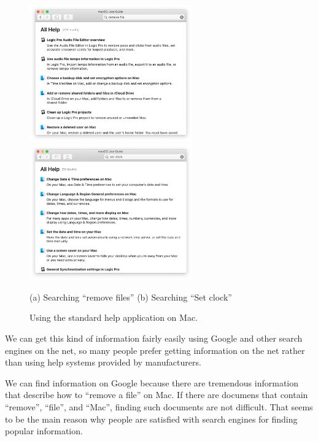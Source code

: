 \documentclass[manuscript,anonymous,review]{acmart}
\begin{document}
\begin{figure}[H]
  \includegraphics[width=7cm,bb=-50 0 950 800]{figures/eaa80e41ddc3d3620fae133007274573.png}
  \includegraphics[width=7cm,bb=-50 0 950 800]{figures/0cd679128d8f69eb2a8a966d6466a8a4.png}
  \par
  (a) Searching ``remove files'' \hspace{3cm} (b) Searching ``Set clock''
  \caption{Using the standard help application on Mac.}
  \label{machelp}
\end{figure}


We can get this kind of information fairly easily using Google and other search engines on the net,
so many people prefer getting information on the net rather than
using help systems provided by manufacturers.

We can find information on Google because there are tremendous information
that describe how to ``remove a file'' on Mac.
If there are documens that contain ``remove'', ``file'', and ``Mac'',
finding such documents are not difficult.
That seems to be the main reason why people are satisfied with search engines
for finding popular information.
\end{document}
